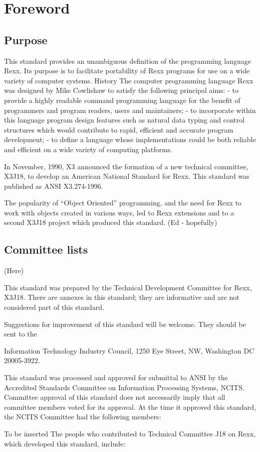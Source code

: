 \hypertarget{foreword}{%
\chapter{Foreword}\label{foreword}}

\hypertarget{purpose}{%
\section{Purpose}\label{purpose}}

This standard provides an unambiguous definition of the programming
language Rexx. Its purpose is to facilitate portability of Rexx programs
for use on a wide variety of computer systems. History The computer
programming language Rexx was designed by Mike Cowlishaw to satisfy the
following principal aims: - to provide a highly readable command
programming language for the benefit of programmers and program readers,
users and maintainers; - to incorporate within this language program
design features such as natural data typing and control structures which
would contribute to rapid, efficient and accurate program development; -
to define a language whose implementations could be both reliable and
efficient on a wide variety of computing platforms.

In November, 1990, X3 announced the formation of a new technical
committee, X3J18, to develop an American National Standard for Rexx.
This standard was published as ANSI X3.274-1996.

The popularity of ``Object Oriented'' programming, and the need for Rexx
to work with objects created in various ways, led to Rexx extensions and
to a second X3J18 project which produced this standard. (Ed - hopefully)

\hypertarget{committee-lists}{%
\section{Committee lists}\label{committee-lists}}

(Here)

This standard was prepared by the Technical Development Committee for
Rexx, X3J18. There are annexes in this standard; they are informative
and are not considered part of this standard.

Suggestions for improvement of this standard will be welcome. They
should be sent to the

Information Technology Industry Council, 1250 Eye Street, NW, Washington
DC 20005-3922.

This standard was processed and approved for submittal to ANSI by the
Accredited Standards Committee on Information Processing Systems, NCITS.
Committee approval of this standard does not necessarily imply that all
committee members voted for its approval. At the time it approved this
standard, the NCITS Committee had the following members:

To be inserted The people who contributed to Technical Committee J18 on
Rexx, which developed this standard, include:
